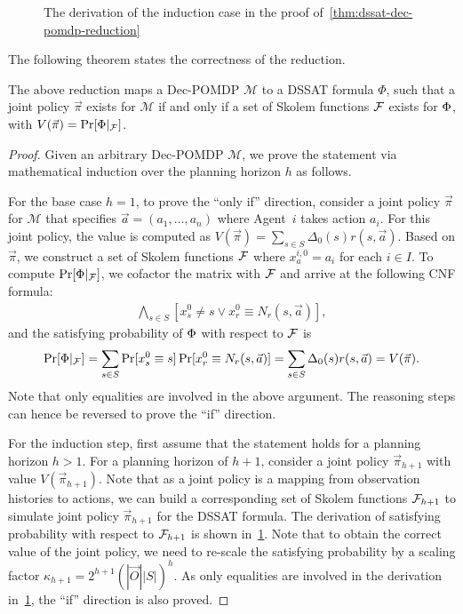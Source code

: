 \begin{figure}[t]
    \centering
    
    \caption{The derivation of the induction case in the proof of~\cref{thm:dssat-dec-pomdp-reduction}}
    \label{fig:dssat-dec-pomdp-derivation}
\end{figure}

The following theorem states the correctness of the reduction.
\begin{theorem}\label{thm:dssat-dec-pomdp-reduction}
    The above reduction maps a Dec-POMDP $\mathcal{M}$ to a DSSAT formula $\Phi$,
    such that a joint policy $\vec{\pi}$ exists for $\mathcal{M}$ if and only if
    a set of Skolem functions $\mathcal{F}$ exists for $\Phi$, with $V(\vec{\pi})=\Pr[\Phi|_{\mathcal{F}}]$.
\end{theorem}
\begin{proof}
    Given an arbitrary Dec-POMDP $\mathcal{M}$,
    we prove the statement via mathematical induction over the planning horizon $h$ as follows.

    For the base case $h=1$,
    to prove the ``only if'' direction,
    consider a joint policy $\vec{\pi}$ for $\mathcal{M}$ that specifies $\vec{a}=(a_1,\ldots,a_n)$
    where Agent~$i$ takes action $a_i$.
    For this joint policy,
    the value is computed as $V(\vec{\pi})=\sum_{s \in S}\Delta_0(s)r(s,\vec{a})$.
    Based on $\vec{\pi}$,
    we construct a set of Skolem functions $\mathcal{F}$ where $x_a^{i,0}=a_i$ for each $i\in I$.
    To compute $\Pr[\Phi|_{\mathcal{F}}]$,
    we cofactor the matrix with $\mathcal{F}$ and arrive at the following CNF formula:
    \begin{align*}
        \bigwedge_{s\in S}[x_s^0\neq s \vee x_r^0 \equiv N_r(s,\vec{a})],
    \end{align*}
    and the satisfying probability of $\Phi$ with respect to $\mathcal{F}$ is
    \begin{align*}
        \Pr[\Phi|_{\mathcal{F}}]=
        \sum_{s\in S}\Pr[x_s^0 \equiv s]\Pr[x_r^0 \equiv N_r(s,\vec{a})]=
        \sum_{s\in S}\Delta_0(s)r(s,\vec{a})=V(\vec{\pi}).
    \end{align*}
    Note that only equalities are involved in the above argument.
    The reasoning steps can hence be reversed to prove the ``if'' direction.

    For the induction step,
    first assume that the statement holds for a planning horizon $h>1$.
    For a planning horizon of $h+1$,
    consider a joint policy $\vec{\pi}_{h+1}$ with value $V(\vec{\pi}_{h+1})$.
    Note that as a joint policy is a mapping from observation histories to actions,
    we can build a corresponding set of Skolem functions $\mathcal{F}_{h+1}$ to simulate joint policy $\vec{\pi}_{h+1}$ for the DSSAT formula.
    The derivation of satisfying probability with respect to $\mathcal{F}_{h+1}$ is shown in~\cref{fig:dssat-dec-pomdp-derivation}.
    Note that to obtain the correct value of the joint policy,
    we need to re-scale the satisfying probability by a scaling factor $\kappa_{h+1}=2^{h+1}(|\vec{O}||S|)^{h}$.
    As only equalities are involved in the derivation in~\cref{fig:dssat-dec-pomdp-derivation},
    the ``if'' direction is also proved.


\end{proof}
